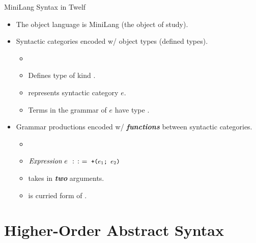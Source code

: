 \documentclass{beamer}
\renewcommand{\emph}[1]{\textbf{\textit{#1}}}
\begin{document}
\begin{frame}{MiniLang Syntax in Twelf}
\begin{itemize}
\item The object language is MiniLang (the object of study).
\item Syntactic categories encoded w/ object types
(defined types).
  \begin{itemize}
  \item \texttt{}
  \item Defines type \texttt{} of kind \texttt{}.
  \item \texttt{} represents syntactic category $e$.
  \item Terms in the grammar of $e$ have type \texttt{}.
  \end{itemize}

\pause
\item Grammar productions encoded w/ \emph{functions} between
syntactic categories.
  \begin{itemize}
  \item {}
  \item $\mathit{Expression} \; e \; \mathrel{\colon\colon\mathord{=}} \; \text{\small\texttt{+($e_1$; $e_2$)}}$
  \item {} takes in \emph{two} arguments.
  \item {} is curried form of .
  \end{itemize}
\end{itemize}
\end{frame}


\section{Higher-Order Abstract Syntax}
\end{document}
